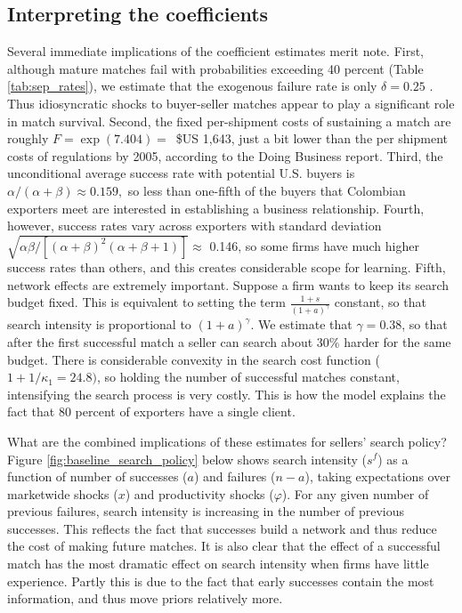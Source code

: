 \documentclass[12pt,titlepage]{article}
\begin{document}
\subsection{Interpreting the coefficients}

Several immediate implications of the coefficient estimates merit note.
First, although mature matches fail with probabilities exceeding 40 percent
(Table \ref{tab:sep_rates}), we estimate that the exogenous failure rate is only $\delta =0.25$%
. Thus idiosyncratic shocks to buyer-seller matches appear to play a
significant role in match survival. Second, the fixed per-shipment costs of
sustaining a match are roughly $F=\exp (7.404)=$\ \$US 1,643, just a bit 
lower than the per shipment costs of regulations by 2005, according to the
Doing Business report. Third, the unconditional average success rate with
potential U.S. buyers is \ $\alpha /(\alpha +\beta )\approx 0.159,$ so less
than one-fifth of the buyers that Colombian exporters meet are interested in
establishing a business relationship. Fourth, however, success rates vary
across exporters with standard deviation\ $\sqrt{\alpha \beta /\left[
(\alpha +\beta )^{2}(\alpha +\beta +1)\right] }\approx $ 0.146, so some
firms have much higher success rates than others, and this creates
considerable scope for learning. Fifth, network effects are extremely
important. Suppose a firm wants to keep its search budget fixed.  This is equivalent to setting the term $\frac{1+s}{(1+a)^\gamma}$ constant, so that search intensity is proportional to $(1+a)^\gamma$.  We estimate that $\gamma = 0.38$, so that after the first successful match
a seller can search about 30\% harder for the same budget. There is considerable convexity in the
search cost function ($1+1/\kappa _{1}=24.8)$, so holding the number of
successful matches constant, intensifying the search process is very costly.
This is how the model explains the fact that 80 percent of exporters have a
single client.


What are the combined implications of these estimates for sellers' search
policy? Figure \ref{fig:baseline_search_policy} below shows search intensity
($s^{f}$) as a function of number of successes ($a$) and failures ($n-a$),
taking expectations over marketwide shocks ($x$) and productivity shocks ($%
\varphi $). For any given number of previous failures, search intensity is
increasing in the number of previous successes. This reflects the fact that
successes build a network and thus reduce the cost of making future matches.
It is also clear that the effect of a successful match has the most dramatic
effect on search intensity when firms have little experience. Partly this is
due to the fact that early successes contain the most information, and thus
move priors relatively more.
\end{document}
